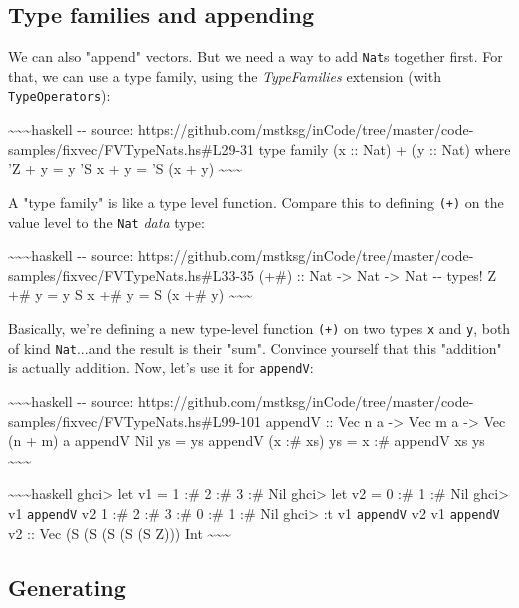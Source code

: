 \documentclass[]{article}
\begin{document}
\subsection{Type families and appending}

We can also "append" vectors. But we need a way to add \texttt{Nat}s together
first. For that, we can use a type family, using the \emph{TypeFamilies}
extension (with \texttt{TypeOperators}):

\textasciitilde{}\textasciitilde{}\textasciitilde{}haskell -\/- source:
https://github.com/mstksg/inCode/tree/master/code-samples/fixvec/FVTypeNats.hs\#L29-31
type family (x :: Nat) + (y :: Nat) where 'Z + y = y 'S x + y = 'S (x + y)
\textasciitilde{}\textasciitilde{}\textasciitilde{}

A "type family" is like a type level function. Compare this to defining
\texttt{(+)} on the value level to the \texttt{Nat} \emph{data} type:

\textasciitilde{}\textasciitilde{}\textasciitilde{}haskell -\/- source:
https://github.com/mstksg/inCode/tree/master/code-samples/fixvec/FVTypeNats.hs\#L33-35
(+\#) :: Nat -\textgreater{} Nat -\textgreater{} Nat -\/- types! Z +\# y = y S x
+\# y = S (x +\# y) \textasciitilde{}\textasciitilde{}\textasciitilde{}

Basically, we're defining a new type-level function \texttt{(+)} on two types
\texttt{x} and \texttt{y}, both of kind \texttt{Nat}...and the result is their
"sum". Convince yourself that this "addition" is actually addition. Now, let's
use it for \texttt{appendV}:

\textasciitilde{}\textasciitilde{}\textasciitilde{}haskell -\/- source:
https://github.com/mstksg/inCode/tree/master/code-samples/fixvec/FVTypeNats.hs\#L99-101
appendV :: Vec n a -\textgreater{} Vec m a -\textgreater{} Vec (n + m) a appendV
Nil ys = ys appendV (x :\# xs) ys = x :\# appendV xs ys
\textasciitilde{}\textasciitilde{}\textasciitilde{}

\textasciitilde{}\textasciitilde{}\textasciitilde{}haskell ghci\textgreater{}
let v1 = 1 :\# 2 :\# 3 :\# Nil ghci\textgreater{} let v2 = 0 :\# 1 :\# Nil
ghci\textgreater{} v1 \texttt{appendV} v2 1 :\# 2 :\# 3 :\# 0 :\# 1 :\# Nil
ghci\textgreater{} :t v1 \texttt{appendV} v2 v1 \texttt{appendV} v2 :: Vec (S (S
(S (S (S Z))) Int \textasciitilde{}\textasciitilde{}\textasciitilde{}

\subsection{Generating}
\end{document}
